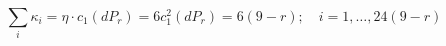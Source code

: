\begin{equation}
\textstyle{\sum_{i}} \kappa_{i} = \eta \cdot c_{1}(dP_{r}) = 6
c^{2}_{1}(dP_{r}) =
6(9-r); \quad i=1,\ldots,24(9-r)  
\end{equation} 
